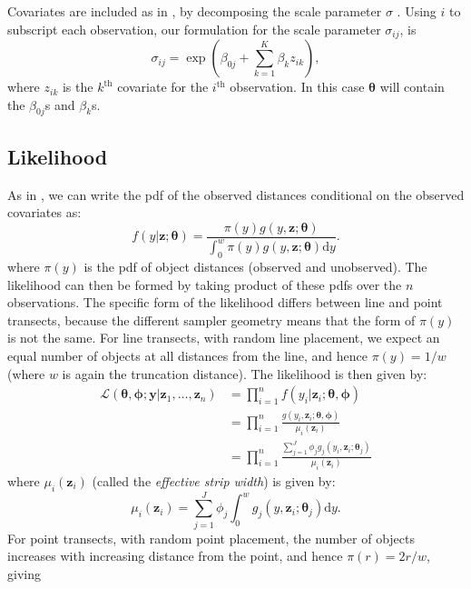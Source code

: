 \documentclass[useAMS,referee,usenatbib]{biom}
\begin{document}
Covariates are included as in \cite{Marques:2003vb}, by decomposing the scale parameter $\sigma$ \cite[see also][]{Marques:2007vm}.  Using $i$ to subscript each observation, our formulation for the scale parameter $\sigma_{ij}$, is
\begin{equation*}
\sigma_{ij} = \exp( \beta_{0j} + \sum_{k=1}^K \beta_k z_{ik}),
\end{equation*}
where $z_{ik}$ is the $k^\text{th}$ covariate for the $i^\text{th}$ observation. In this case $\bm{\theta}$ will contain the $\beta_{0j}$s and $\beta_k$s.

\subsection{Likelihood}
\label{s:likelihood}

As in \cite{Buckland:2004ts}, we can write the pdf of the observed distances conditional on the observed covariates as:
\begin{equation*}
f(y \vert \bm{z}; \bm{\theta}) = \frac{\pi(y)g(y, \bm{z}; \bm{\theta})}{\int_0^w \pi(y)g(y, \bm{z}; \bm{\theta}) \text{d}y}.
\end{equation*}
where $\pi(y)$ is the pdf of object distances (observed and unobserved). The likelihood can then be formed by taking product of these pdfs over the $n$ observations.  The specific form of the likelihood differs between line and point transects, because the different sampler geometry means that the form of $\pi(y)$ is not the same.  For line transects, with random line placement, we expect an equal number of objects at all distances from the line, and hence $\pi(y)=1/w$ (where $w$ is again the truncation distance).  The likelihood is then given by:
\begin{align*}
\mathcal{L}(\bm{\theta},\bm{\phi}; \mathbf{y} \vert \bm{z}_1, \ldots, \bm{z}_n) &= \prod_{i=1}^n f(y_i \vert \bm{z}_i; \bm{\theta},\bm{\phi})\\
&= \prod_{i=1}^n \frac{g(y_i,\bm{z}_i; \bm{\theta},\bm{\phi})}{\mu_i(\bm{z}_i)}\\
&= \prod_{i=1}^n \frac{\sum_{j=1}^J \phi_j g_j(y_i,\bm{z}_i; \bm{\theta}_j)}{\mu_i(\bm{z}_i)}
\end{align*}
where $\mu_i(\bm{z}_i)$ (called the \textit{effective strip width}) is given by:
\begin{equation}
\label{e:esw}
\mu_{i}(\bm{z}_i) = \sum_{j=1}^J \phi_j \int_0^w  g_j(y,\bm{z}_i; \bm{\theta}_j) \text{d}y.
\end{equation}
For point transects, with random point placement, the number of objects increases with increasing distance from the point, and hence $\pi(r)=2r/w$, giving
\end{document}
